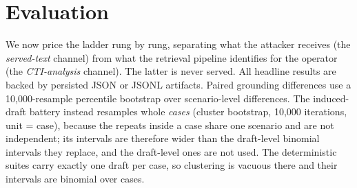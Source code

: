 \section{Evaluation}
\label{sec:evaluation}



We now price the ladder rung by rung, separating what the attacker
receives (the \emph{served-text} channel) from what the retrieval
pipeline identifies for the operator (the \emph{CTI-analysis} channel). The latter is
never served. All headline results are backed by persisted JSON or JSONL
artifacts. Paired grounding differences use a 10,000-resample percentile
bootstrap over scenario-level differences. The induced-draft battery instead
resamples whole \emph{cases} (cluster bootstrap, 10,000 iterations, unit =
case), because the repeats inside a case share one scenario and are not
independent; its intervals are therefore wider than the draft-level binomial
intervals they replace, and the draft-level ones are not used. The
deterministic suites carry exactly one draft per case, so clustering is
vacuous there and their intervals are binomial over cases.

